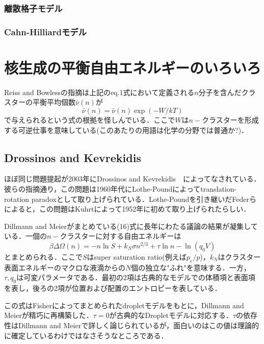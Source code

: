 \documentclass[a4j,10pt]{jarticle}
\begin{document}
\subsubsection{離散格子モデル}
\subsubsection{Cahn-Hilliardモデル}
\section{核生成の平衡自由エネルギーのいろいろ}
Reiss and Bowless\cite{ReissBowles99}の指摘は上記のeq.1式において定義される$n$分子を含んだクラスターの平衡平均個数$\bar{\nu}(n)$が
\begin{equation}
\bar{\nu}(n) = \bar{\nu}(n) \exp\left(-W/kT\right)
\end{equation}
で与えられるという式の根拠を怪しんでいる．ここで$W$は$n-$クラスターを形成する可逆仕事を意味している(このあたりの用語は化学の分野では普通か?)．

\subsection{Drossinos and Kevrekidis}
ほぼ同じ問題提起が2003年にDrossinos and Kevrekidis　\cite{DrossinosKevrekidis03}によってなされている．彼らの指摘通り，この問題は1960年代にLothe-Poundによってtranslation-rotation paradoxとして取り上げられている．Lothe-Poundを引き継いだFederら\cite{Feder66}によると，この問題はKuhrtによって\cite{Kuhrt52}1952年に初めて取り上げられたらしい．

Dillmann and Meier\cite{DillmannMeier91}がまとめている(16)式に長年にわたる議論の結果が凝集している．一個の$n-$クラスターに対する自由エネルギーは
\begin{equation}
\beta \Delta \Omega(n) = -n \ln S + k_N \sigma n^{2/3} +
\tau \ln n - \ln(q_0 V)
\end{equation}
とまとめられる．ここで$S$はsuper saturation ratio(例えば$p_e/p$)，$k_N$はクラスター表面エネルギーのマクロな液滴からの$N$個の独立な"ふれ"を意味する．一方，$\tau, q_0$は可変パラメータである．最初の2項は古典的なモデルでの体積項と表面項を表し，後ろの2項が位置および配置のエントロピーを表している．

この式はFisher\cite{Fisher65,Fisher67}によってまとめられたdropletモデルをもとに，Dillmann and Meier\cite{DillmannMeier91}が精巧に再構築した．$\tau = 0$が古典的なDropletモデルに対応する．$\tau$の依存性はDillmann and Meierで詳しく論じられているが，面白いのはこの値は理論的に確定しているわけではなさそうなところである．
\end{document}
